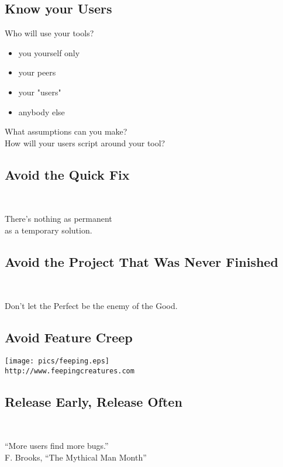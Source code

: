 \documentclass[xga]{xdvislides}
\begin{document}
\subsection{Know your Users}
Who will use your tools?
\begin{itemize}
	\item you yourself only
	\item your peers
	\item your "users"
	\item anybody else
\end{itemize}
\vspace{.5in}
What assumptions can you make? \\
How will your users script around your tool?

\subsection{Avoid the Quick Fix}
\\
\Huge
\begin{center}
There's nothing as permanent \\
as a temporary solution.
\end{center}
\Normalsize

\subsection{Avoid the Project That Was Never Finished}
\\
\Huge
\begin{center}
	Don't let the Perfect be the enemy of the Good.
\end{center}
\Normalsize

\subsection{Avoid Feature Creep}
\vspace*{\fill}
\begin{center}
	\texttt{[image: pics/feeping.eps]} \\
	\small
	\verb+http://www.feepingcreatures.com+
\end{center}
\vspace*{\fill}

\subsection{Release Early, Release Often}
\\
\Huge
\begin{center}
	``More users find more bugs.'' \\
	\addvspace{.2in}
	\small F. Brooks, ``The Mythical Man Month''
\end{center}
\Normalsize
\end{document}

